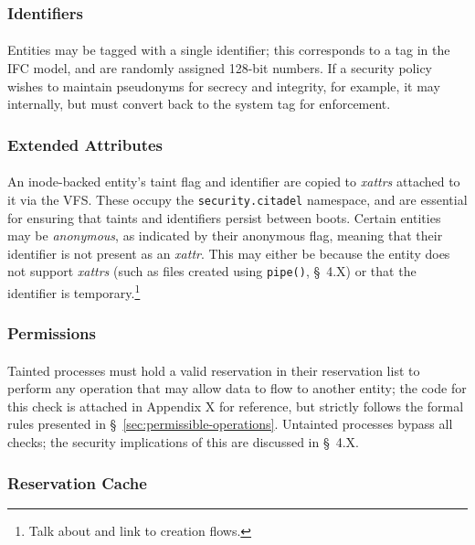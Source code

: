 \subsubsection{Identifiers}
\paragraph{} Entities may be tagged with a single identifier; this corresponds to a tag in the IFC model, and are randomly assigned 128-bit numbers. If a security policy wishes to maintain pseudonyms for secrecy and integrity, for example, it may internally, but must convert back to the system tag for enforcement.

\subsubsection{Extended Attributes} 
\paragraph{} An inode-backed entity's taint flag and identifier are copied to \textit{xattrs} attached to it via the VFS. These occupy the \texttt{security.citadel} namespace, and are essential for ensuring that taints and identifiers persist between boots. Certain entities may be \textit{anonymous}, as indicated by their anonymous flag, meaning that their identifier is not present as an \textit{xattr}. This may either be because the entity does not support \textit{xattrs} (such as files created using \texttt{pipe()}, §~4.X) or that the identifier is temporary.\footnote{Talk about and link to creation flows.}


\subsubsection{Permissions} 
\paragraph{} Tainted processes must hold a valid reservation in their reservation list to perform any operation that may allow data to flow to another entity; the code for this check is attached in Appendix X for reference, but strictly follows the formal rules presented in §~\ref{sec:permissible-operations}. Untainted processes bypass all checks; the security implications of this are discussed in §~4.X.

\subsubsection{Reservation Cache} 
